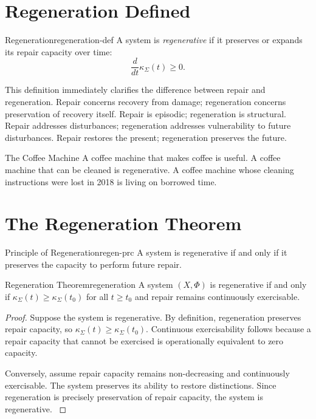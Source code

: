 \documentclass[12pt,twoside,openright]{book}
\newcounter{exercise}[chapter]
\begin{document}
\section{Regeneration Defined}
\label{sec:ch11-defined}

\begin{definition}{Regeneration}{regeneration-def}
  A system is \emph{regenerative} if it preserves or
  expands its repair capacity over time:
  \[
    \frac{d}{dt}\kappa_\Sigma(t) \ge 0.
  \]
\end{definition}

This definition immediately clarifies the difference
between repair and regeneration. Repair concerns recovery
from damage; regeneration concerns preservation of recovery
itself. Repair is episodic; regeneration is structural.
Repair addresses disturbances; regeneration addresses
vulnerability to future disturbances. Repair restores the
present; regeneration preserves the future.

\begin{distinctionaside}{The Coffee Machine}
A coffee machine that makes coffee is useful. A coffee
machine that can be cleaned is regenerative. A coffee machine
whose cleaning instructions were lost in 2018 is living on
borrowed time.
\end{distinctionaside}

\section{The Regeneration Theorem}
\label{sec:ch11-theorem}

\begin{principle}{Principle of Regeneration}{regen-prc}
  A system is regenerative if and only if it preserves the
  capacity to perform future repair.
\end{principle}

\begin{theorem}{Regeneration Theorem}{regeneration}
  A system $(X,\Phi)$ is regenerative if and only if
  $\kappa_\Sigma(t)\ge\kappa_\Sigma(t_0)$ for all $t\ge t_0$
  and repair remains continuously
  exercisable.
\end{theorem}

\begin{proof}
  Suppose the system is regenerative. By definition,
  regeneration preserves repair capacity, so
  $\kappa_\Sigma(t)\ge\kappa_\Sigma(t_0)$. Continuous
  exercisability follows because a repair capacity that
  cannot be exercised is operationally equivalent to zero
  capacity.

  Conversely, assume repair capacity remains non-decreasing
  and continuously exercisable. The system preserves its
  ability to restore distinctions. Since regeneration is
  precisely preservation of repair capacity, the system is
  regenerative. \parencite{holling1973,gunderson2002}
\end{proof}
\end{document}

